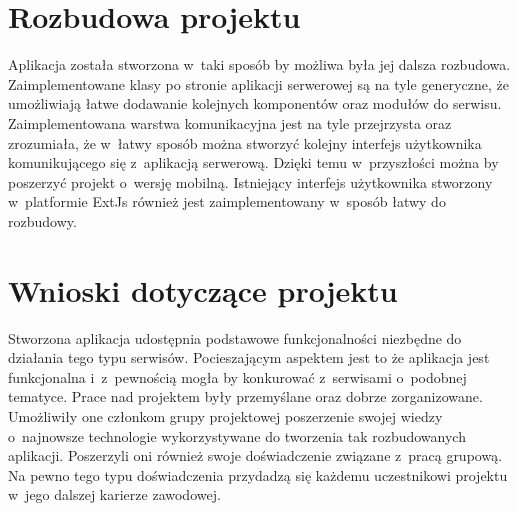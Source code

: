 \section{Rozbudowa projektu}

Aplikacja została stworzona w~taki sposób by możliwa była jej dalsza rozbudowa. Zaimplementowane klasy po stronie aplikacji serwerowej są na tyle generyczne, że umożliwiają łatwe dodawanie kolejnych komponentów oraz modułów do serwisu. Zaimplementowana warstwa komunikacyjna jest na tyle przejrzysta oraz zrozumiała, że w~łatwy sposób można stworzyć kolejny interfejs użytkownika komunikującego się z~aplikacją serwerową. Dzięki temu w~przyszłości można by poszerzyć projekt o~wersję mobilną.
Istniejący interfejs użytkownika stworzony w~platformie ExtJs również jest zaimplementowany w~sposób łatwy do rozbudowy. 

\section{Wnioski dotyczące projektu}

Stworzona aplikacja udostępnia podstawowe funkcjonalności niezbędne do działania tego typu serwisów. Pocieszającym aspektem jest to że aplikacja jest funkcjonalna i~z~pewnością mogła by konkurować z~serwisami o~podobnej tematyce. 
Prace nad projektem były przemyślane oraz dobrze zorganizowane. Umożliwiły one członkom grupy projektowej poszerzenie swojej wiedzy o~najnowsze technologie wykorzystywane do tworzenia tak rozbudowanych aplikacji. Poszerzyli oni również swoje doświadczenie związane z~pracą grupową. 
Na pewno tego typu doświadczenia przydadzą się każdemu uczestnikowi projektu w~jego dalszej karierze zawodowej.